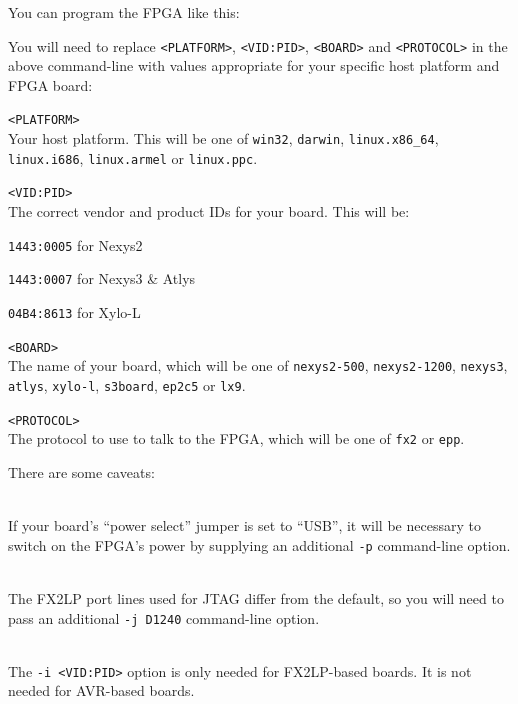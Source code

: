 
You can program the FPGA like this:


You will need to replace \texttt{<PLATFORM>}, \texttt{<VID:PID>}, \texttt{<BOARD>} and \texttt{<PROTOCOL>} in the above command-line with values appropriate for your specific host platform and FPGA board:

\begin{desc}
  \item[\texttt{<PLATFORM>}] \hfill \\
    Your host platform. This will be one of \texttt{win32}, \texttt{darwin}, \texttt{linux.x86\_64},\\ \texttt{linux.i686}, \texttt{linux.armel} or \texttt{linux.ppc}.
  \item[\texttt{<VID:PID>}] \hfill \\
    The correct vendor and product IDs for your board. This will be:
    \begin{blobs}
      \item \texttt{1443:0005} for Nexys2
      \item \texttt{1443:0007} for Nexys3 \& Atlys
      \item \texttt{04B4:8613} for Xylo-L
    \end{blobs}
  \item[\texttt{<BOARD>}] \hfill \\
    The name of your board, which will be one of \texttt{nexys2-500}, \texttt{nexys2-1200}, \texttt{nexys3}, \texttt{atlys}, \texttt{xylo-l}, \texttt{s3board}, \texttt{ep2c5} or \texttt{lx9}.
  \item[\texttt{<PROTOCOL>}] \hfill \\
    The protocol to use to talk to the FPGA, which will be one of \texttt{fx2} or \texttt{epp}.
\end{desc}

There are some caveats:

\begin{desc}
  \item[\sffamily{Nexys2 Users:}] \hfill \\
    If your board's ``power select'' jumper is set to ``USB'', it will be necessary to switch on the FPGA's power by supplying an additional \texttt{-p} command-line option.
  \item[\sffamily{Xylo-L Users:}] \hfill \\
    The FX2LP port lines used for JTAG differ from the default, so you will need to pass an additional \texttt{-j D1240} command-line option.
  \item[\sffamily{AVR-Based Boards:}] \hfill \\
    The \texttt{-i <VID:PID>} option is only needed for FX2LP-based boards. It is not needed for AVR-based boards.
\end{desc}


